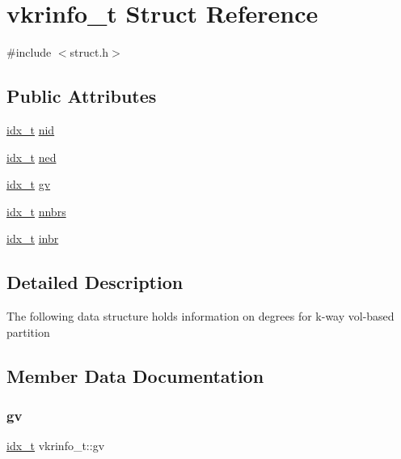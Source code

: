 \hypertarget{a00726}{}\section{vkrinfo\+\_\+t Struct Reference}
\label{a00726}


{\ttfamily \#include $<$struct.\+h$>$}

\subsection*{Public Attributes}
\begin{DoxyCompactItemize}
\item 
\hyperlink{a00876_aaa5262be3e700770163401acb0150f52}{idx\+\_\+t} \hyperlink{a00726_a9befff2ea2c811563ad38aaf921a8f21}{nid}
\item 
\hyperlink{a00876_aaa5262be3e700770163401acb0150f52}{idx\+\_\+t} \hyperlink{a00726_a0af0fec11cab7aa7a343c268832cc709}{ned}
\item 
\hyperlink{a00876_aaa5262be3e700770163401acb0150f52}{idx\+\_\+t} \hyperlink{a00726_a8d9e4e351610f7b03203940a134bcd74}{gv}
\item 
\hyperlink{a00876_aaa5262be3e700770163401acb0150f52}{idx\+\_\+t} \hyperlink{a00726_aa337d338d253918348c5ba9e4a5082ca}{nnbrs}
\item 
\hyperlink{a00876_aaa5262be3e700770163401acb0150f52}{idx\+\_\+t} \hyperlink{a00726_a85a0150ff0f0fe87b0fc3bf445b60bca}{inbr}
\end{DoxyCompactItemize}


\subsection{Detailed Description}
The following data structure holds information on degrees for k-\/way vol-\/based partition 

\subsection{Member Data Documentation}
\mbox{\label{a00726_a8d9e4e351610f7b03203940a134bcd74}} 
\subsubsection{\texorpdfstring{gv}{gv}}
{\footnotesize\ttfamily \hyperlink{a00876_aaa5262be3e700770163401acb0150f52}{idx\+\_\+t} vkrinfo\+\_\+t\+::gv}

